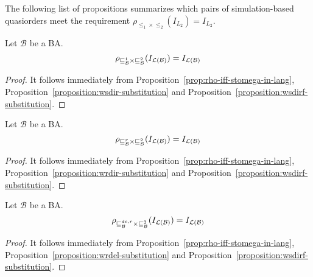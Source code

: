 The following list of propositions summarizes which pairs of simulation-based
quasiorders meet the requirement $\rho_{\leq_1 \times \leq_2}(I_{L_2}) = I_{L_2}$.

\begin{proposition}
\label{prop:wsdir-wrdirf-ok}
Let $\mathcal{B}$ be a BA.
\[ \rho_{\sqsubseteq^1_{\mathcal{B}} \times \sqsubseteq_{\mathcal{B}}^{2}}(I_{\mathcal{L}(\mathcal{B})}) = I_{\mathcal{L}(\mathcal{B})} \]
\end{proposition}

\begin{proof}
It follows immediately from Proposition~\ref{prop:rho-iff-stomega-in-lang},
Proposition~\ref{proposition:wsdir-substitution}
and Proposition~\ref{proposition:wsdirf-substitution}.
\end{proof}

\begin{proposition}
\label{prop:wrdir-wrdirf-ok}
Let $\mathcal{B}$ be a BA.
\[ \rho_{\sqsubseteq_{\mathcal{B}}^r \times \sqsubseteq_{\mathcal{B}}^{2}}(I_{\mathcal{L}(\mathcal{B})}) = I_{\mathcal{L}(\mathcal{B})} \]
\end{proposition}

\begin{proof}
It follows immediately from Proposition~\ref{prop:rho-iff-stomega-in-lang},
Proposition~\ref{proposition:wrdir-substitution} and
Proposition~\ref{proposition:wsdirf-substitution}.
\end{proof}

\begin{proposition}
\label{prop:wrdel-wrdirf-ok}
Let $\mathcal{B}$ be a BA.
\[ \rho_{\sqsubseteq_{\mathcal{B}}^{de,r} \times \sqsubseteq_{\mathcal{B}}^{2}}(I_{\mathcal{L}(\mathcal{B})}) = I_{\mathcal{L}(\mathcal{B})} \]
\end{proposition}

\begin{proof}
It follows immediately from Proposition~\ref{prop:rho-iff-stomega-in-lang},
Proposition~\ref{proposition:wrdel-substitution}
and Proposition~\ref{proposition:wsdirf-substitution}.
\end{proof}

